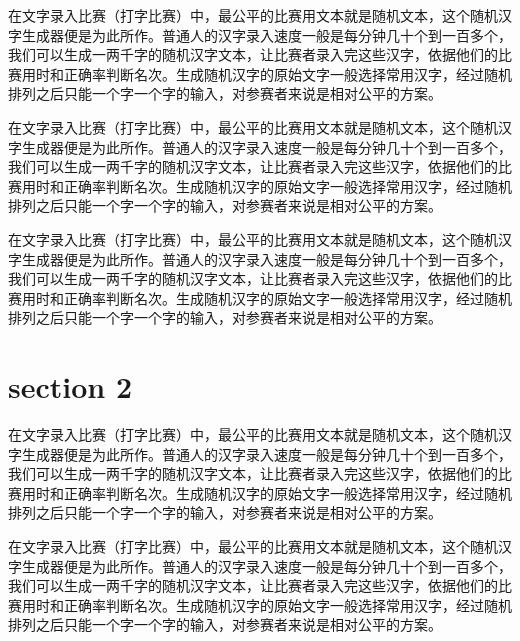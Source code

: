 \documentclass[12pt,hyperref,UTF8]{ctexbook}
\begin{document}
在文字录入比赛（打字比赛）中，最公平的比赛用文本就是随机文本，这个随机汉字生成器便是为此所作。普通人的汉字录入速度一般是每分钟几十个到一百多个，我们可以生成一两千字的随机汉字文本，让比赛者录入完这些汉字，依据他们的比赛用时和正确率判断名次。生成随机汉字的原始文字一般选择常用汉字，经过随机排列之后只能一个字一个字的输入，对参赛者来说是相对公平的方案。

在文字录入比赛（打字比赛）中，最公平的比赛用文本就是随机文本，这个随机汉字生成器便是为此所作。普通人的汉字录入速度一般是每分钟几十个到一百多个，我们可以生成一两千字的随机汉字文本，让比赛者录入完这些汉字，依据他们的比赛用时和正确率判断名次。生成随机汉字的原始文字一般选择常用汉字，经过随机排列之后只能一个字一个字的输入，对参赛者来说是相对公平的方案。

在文字录入比赛（打字比赛）中，最公平的比赛用文本就是随机文本，这个随机汉字生成器便是为此所作。普通人的汉字录入速度一般是每分钟几十个到一百多个，我们可以生成一两千字的随机汉字文本，让比赛者录入完这些汉字，依据他们的比赛用时和正确率判断名次。生成随机汉字的原始文字一般选择常用汉字，经过随机排列之后只能一个字一个字的输入，对参赛者来说是相对公平的方案。

\section{section 2}

在文字录入比赛（打字比赛）中，最公平的比赛用文本就是随机文本，这个随机汉字生成器便是为此所作。普通人的汉字录入速度一般是每分钟几十个到一百多个，我们可以生成一两千字的随机汉字文本，让比赛者录入完这些汉字，依据他们的比赛用时和正确率判断名次。生成随机汉字的原始文字一般选择常用汉字，经过随机排列之后只能一个字一个字的输入，对参赛者来说是相对公平的方案。

在文字录入比赛（打字比赛）中，最公平的比赛用文本就是随机文本，这个随机汉字生成器便是为此所作。普通人的汉字录入速度一般是每分钟几十个到一百多个，我们可以生成一两千字的随机汉字文本，让比赛者录入完这些汉字，依据他们的比赛用时和正确率判断名次。生成随机汉字的原始文字一般选择常用汉字，经过随机排列之后只能一个字一个字的输入，对参赛者来说是相对公平的方案。

\backmatter
\end{document}
